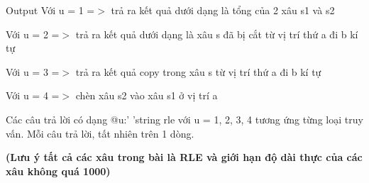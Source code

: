 Output
Với u = 1 =$>$ trả ra kết quả dưới dạng là tổng của 2 xâu s1 và s2

Với u = 2 =$>$ trả ra kết quả dưới dạng là xâu s đã bị cắt từ vị trí thứ a đi b kí tự

Với u = 3 =$>$ trả ra kết quả copy trong xâu s từ vị trí thứ a đi b kí tự

Với u = 4 =$>$ chèn xâu s2 vào xâu s1 ở vị trí a

Các câu trả lời có dạng @u:' 'string rle với u = 1, 2, 3, 4 tương ứng từng loại truy vấn. Mỗi câu trả lời, tất nhiên trên 1 dòng.

\textbf{(Lưu ý tất cả các xâu trong bài là RLE và giới hạn độ dài thực của các xâu không quá 1000) }\textbf{}